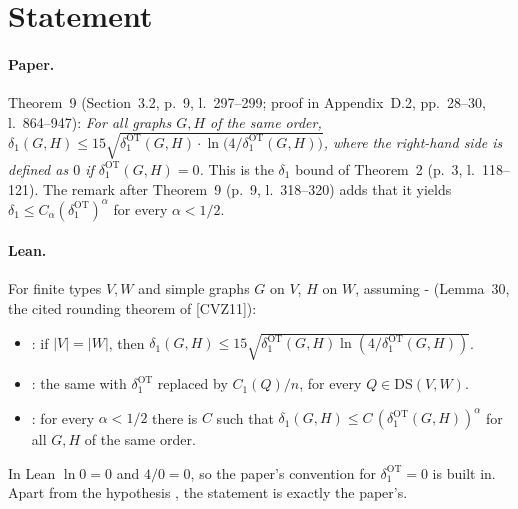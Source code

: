 

\paperversion

\section{Statement}

\paragraph{Paper.} Theorem~9 (Section~3.2, p.~9, l.~297--299; proof in Appendix~D.2, pp.~28--30, l.~864--947):
\emph{For all graphs $G,H$ of the same order,
$\delta_1(G,H)\le15\sqrt{\delta_1^{\mathrm{OT}}(G,H)\cdot\ln\bigl(4/\delta_1^{\mathrm{OT}}(G,H)\bigr)}$, where the
right-hand side is defined as $0$ if $\delta_1^{\mathrm{OT}}(G,H)=0$.} This is the $\delta_1$ bound of
Theorem~2 (p.~3, l.~118--121). The remark after Theorem~9 (p.~9, l.~318--320) adds that it yields
$\delta_1\le C_\alpha(\delta_1^{\mathrm{OT}})^\alpha$ for every $\alpha<1/2$.

\paragraph{Lean.} For finite types $V,W$ and simple graphs $G$ on $V$, $H$ on $W$, assuming
\hyp{} (Lemma~30, the cited rounding theorem of [CVZ11]):
\begin{itemize}
\item {}: if $|V|=|W|$, then
  $\delta_1(G,H)\le15\sqrt{\delta_1^{\mathrm{OT}}(G,H)\ln(4/\delta_1^{\mathrm{OT}}(G,H))}$.
\item {}: the same with $\delta_1^{\mathrm{OT}}$ replaced by $C_1(Q)/n$, for every
  $Q\in\mathrm{DS}(V,W)$.
\item {}: for every $\alpha<1/2$ there is $C$ such that
  $\delta_1(G,H)\le C\,(\delta_1^{\mathrm{OT}}(G,H))^\alpha$ for all $G,H$ of the same order.
\end{itemize}
In Lean $\ln0=0$ and $4/0=0$, so the paper's convention for $\delta_1^{\mathrm{OT}}=0$ is built in. Apart from
the hypothesis , the statement is exactly the paper's.

